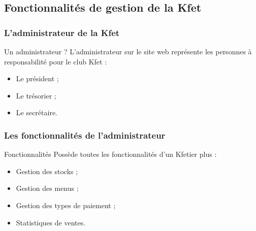 \documentclass{polytech-presentation}
\begin{document}
            \subsection<presentation>{Fonctionnalités de gestion de la Kfet}%
                \begin{frame}
		  \frametitle{L'administrateur de la Kfet}
                    \begin{block}{Un administrateur ?}
		      L'administrateur sur le site web représente les personnes à responsabilité pour le club Kfet :
		      \begin{itemize}
		       \item Le président ;
		       \item Le trésorier ;
		       \item Le secrétaire.
		      \end{itemize}
                    \end{block}
                            \end{frame}
                
                \begin{frame}
                 \frametitle{Les fonctionnalités de l'administrateur}
                 \begin{block}{Fonctionnalités}
                  Possède toutes les fonctionnalités d'un Kfetier plus :
                  \begin{itemize}
                   \item Gestion des stocks ;
		   \item Gestion des menus ;
		   \item Gestion des types de paiement ;
		   \item Statistiques de ventes.
                  \end{itemize}
                 \end{block}
                \end{frame}

\end{document}
